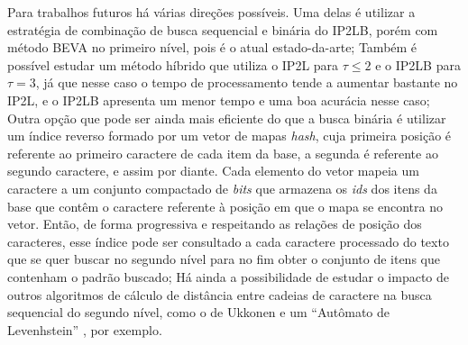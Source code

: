 Para trabalhos futuros há várias direções possíveis. Uma delas é utilizar a estratégia de combinação de busca sequencial e binária do IP2LB, porém com método BEVA no primeiro nível, pois é o atual estado-da-arte; Também é possível estudar um método híbrido que utiliza o IP2L para $\tau \leq 2$ e o IP2LB para $\tau = 3$, já que nesse caso o tempo de processamento tende a aumentar bastante no IP2L, e o IP2LB apresenta um menor tempo e uma boa acurácia nesse caso; Outra opção que pode ser ainda mais eficiente do que a busca binária é utilizar um índice reverso formado por um vetor de mapas \textit{hash}, cuja primeira posição é referente ao primeiro caractere de cada item da base, a segunda é referente ao segundo caractere, e assim por diante. Cada elemento do vetor mapeia um caractere a um conjunto compactado de \textit{bits} que armazena os \textit{ids} dos itens da base que contêm o caractere referente à posição em que o mapa se encontra no vetor. Então, de forma progressiva e respeitando as relações de posição dos caracteres, esse índice pode ser consultado a cada caractere processado do texto que se quer buscar no segundo nível para no fim obter o conjunto de itens que contenham o padrão buscado; Há ainda a possibilidade de estudar o impacto de outros algoritmos de cálculo de distância entre cadeias de caractere na busca sequencial do segundo nível, como o de Ukkonen \citep{ukkonen1985algorithms} e um ``Autômato de Levenhstein'' \citep{schulz2002fast}, por exemplo.